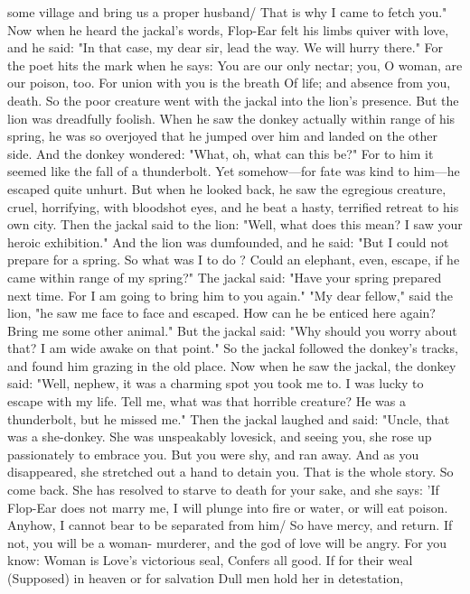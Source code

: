 \documentclass{book}
\begin{document}
some village and bring us a proper husband/ That is
why I came to fetch you."
Now when he heard the jackal's words, Flop-Ear
felt his limbs quiver with love, and he said: "In
that case, my dear sir, lead the way. We will hurry
there." For the poet hits the mark when he says:
You are our only nectar; you,
O woman, are our poison, too.
For union with you is the breath
Of life; and absence from you, death.
So the poor creature went with the jackal into
the lion's presence. But the lion was dreadfully
foolish. When he saw the donkey actually within
range of his spring, he was so overjoyed that he
jumped over him and landed on the other side. And
the donkey wondered: "What, oh, what can this be?"
For to him it seemed like the fall of a thunderbolt.
Yet somehow---for fate was kind to him---he escaped
quite unhurt. But when he looked back, he saw the
egregious creature, cruel, horrifying, with bloodshot
eyes, and he beat a hasty, terrified retreat to his own
city.
Then the jackal said to the lion: "Well, what does
this mean? I saw your heroic exhibition." And the
lion was dumfounded, and he said: "But I could not
prepare for a spring. So what was I to do ? Could an
elephant, even, escape, if he came within range of
my spring?"
The jackal said: "Have your spring prepared
next time. For I am going to bring him to you again."
"My dear fellow," said the lion, "he saw me face to
face and escaped. How can he be enticed here again?
Bring me some other animal."
But the jackal said: "Why should you worry
about that? I am wide awake on that point." So
the jackal followed the donkey's tracks, and found
him grazing in the old place.
Now when he saw the jackal, the donkey said:
"Well, nephew, it was a charming spot you took me
to. I was lucky to escape with my life. Tell me, what
was that horrible creature? He was a thunderbolt,
but he missed me."
Then the jackal laughed and said: "Uncle, that
was a she-donkey. She was unspeakably lovesick,
and seeing you, she rose up passionately to embrace
you. But you were shy, and ran away. And as you
disappeared, she stretched out a hand to detain you.
That is the whole story. So come back. She has
resolved to starve to death for your sake, and she
says: 'If Flop-Ear does not marry me, I will plunge
into fire or water, or will eat poison. Anyhow, I
cannot bear to be separated from him/ So have
mercy, and return. If not, you will be a woman-
murderer, and the god of love will be angry. For you
know:
Woman is Love's victorious seal,
Confers all good. If for their weal
(Supposed) in heaven or for salvation
Dull men hold her in detestation,
\end{document}
